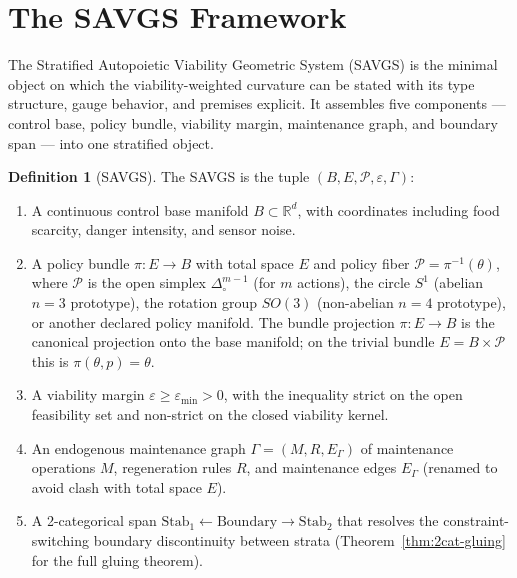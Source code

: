 \documentclass[11pt,a4paper]{article}
\theoremstyle{plain}
\theoremstyle{definition}
\newtheorem{definition}[theorem]{Definition}
\theoremstyle{remark}
\newcommand{\RR}{\mathbb{R}}
\newcommand{\Stab}{\mathrm{Stab}}
\begin{document}

\section{The SAVGS Framework}\label{sec:savgs}

The Stratified Autopoietic Viability Geometric System (SAVGS) is the
minimal object on which the viability-weighted curvature can be stated
with its type structure, gauge behavior, and premises explicit. It
assembles five components --- control base, policy bundle, viability
margin, maintenance graph, and boundary span --- into one stratified
object.

\begin{definition}[SAVGS]
\label{def:savgs}
The SAVGS is the tuple $(B, E, \mathcal P, \varepsilon, \Gamma)$:
\begin{enumerate}[leftmargin=*,itemsep=2pt]
\item A continuous control base manifold $B \subset \RR^d$, with
coordinates including food
scarcity, danger intensity, and sensor noise.
\item A policy bundle $\pi : E \to B$ with total space $E$ and policy
fiber $\mathcal P = \pi^{-1}(\theta)$, where $\mathcal P$ is the open
simplex $\Delta^{m-1}_\circ$ (for $m$ actions), the circle $S^1$
(abelian $n=3$ prototype), the rotation group $SO(3)$ (non-abelian
$n=4$ prototype), or another declared policy manifold. The bundle
projection $\pi : E \to B$ is the canonical projection onto the base
manifold; on the trivial bundle $E = B \times \mathcal P$ this is
$\pi(\theta, p) = \theta$.
\item A viability margin $\varepsilon\geq\varepsilon_{\min}>0$, with
the inequality strict on the open feasibility set and non-strict on the
closed viability kernel.
\item An endogenous maintenance graph $\Gamma=(M, R, E_\Gamma)$ of
maintenance operations $M$, regeneration rules $R$, and maintenance
edges $E_\Gamma$ (renamed to avoid clash with total space $E$).
\item A 2-categorical span $\Stab_1\leftarrow\mathrm{Boundary}\rightarrow
\Stab_2$ that resolves the constraint-switching boundary discontinuity
between strata (Theorem~\ref{thm:2cat-gluing} for
the full gluing theorem).
\end{enumerate}
\end{definition}
\end{document}
